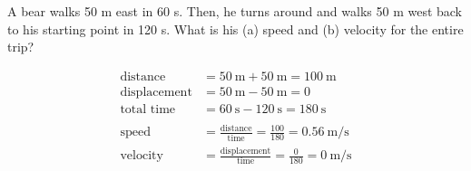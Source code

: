 \documentclass[10pt]{exam}
\begin{document}
\begin{questions}
\begin{multicols}{2}

    \end{multicols}

  \question
    A bear walks 50 m east in 60 s.  Then, he turns around and walks 50 m west back to his starting point in 120 s.  What is his (a) speed and (b) velocity for the entire trip?

    \begin{solution}
      \begin{multicols}{2}

        \begin{align*}
          \text{distance} &= 50~\text{m} + 50~\text{m} = 100~\text{m} \\
          \text{displacement} &= 50~\text{m} - 50~\text{m} = 0 \\
          \text{total time} &= 60~\text{s} - 120~\text{s} = 180~\text{s} \\ 
          \\
          \text {speed} &= \frac{\text{distance}}{\text{time}} = \frac{100}{180} = 0.56~\text{m/s} \\
          \text {velocity} &= \frac{\text{displacement}}{\text{time}} = \frac{0}{180} = 0~\text{m/s}
        \end{align*}



\end{multicols}
\end{solution}
\end{questions}
\end{document}
